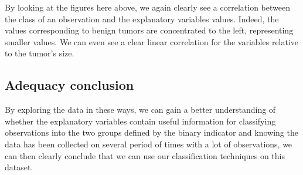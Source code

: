 By looking at the figures here above, we again clearly see a correlation between the class of an observation and the explanatory variables values. Indeed, the values corresponding to benign tumors are concentrated to the left, representing smaller values. We can even see a clear linear correlation for the variables relative to the tumor's size. 


\subsection{Adequacy conclusion}
By exploring the data in these ways, we can gain a better understanding of whether the explanatory variables contain useful information for classifying observations into the two groups defined by the binary indicator and knowing the data has been collected on several period of times with a lot of observations, we can then clearly conclude that we can use our classification techniques on this dataset.